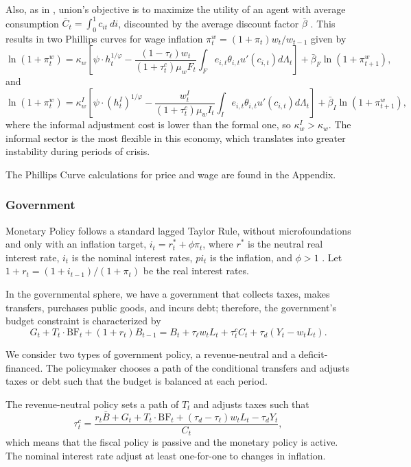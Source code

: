 \documentclass[12pt]{article}
\begin{document}
Also, as in \textcite{hagedorn2019fiscal}, union's objective is to maximize the utility
of an agent with average consumption $\bar C_t = \int_0^1 c_{it} \: di$, discounted by
the average discount factor $\bar \beta$ \parencite{auclert2021exchange}. This results
in two Phillips curves for wage inflation $\pi_t^w = (1+\pi_t) w_t / w_{t-1} $ given by
\[
\ln (1+\pi_t^w)
= \kappa_w \left[ \psi \cdot h_t^{1/\varphi}
- \frac{(1-\tau_\ell) w_t}{(1+\tau^c_t)\mu_w F_t}
    \int_F e_{i,t} \theta_{i,t} u'(c_{i,t}) d\Lambda_t \right]
+ \bar \beta_F \ln (1+\pi_{t+1}^w),
\]
and
\[
\ln (1+\pi_t^w)
= \kappa_w^I \left[ \psi \cdot \left( h_t^I \right)^{1/\varphi}
- \frac{w_t^I}{(1+\tau^c_t) \mu_w I_t}
    \int_I e_{i,t} \theta_{i,t} u'(c_{i,t}) d\Lambda_t \right]
+ \bar \beta_I \ln (1+\pi_{t+1}^w),
\]
where the informal adjustment cost is lower than the formal one, so
$\kappa_w^I > \kappa_w$. The informal sector is the most flexible in this economy, which
translates into greater instability during periods of crisis.

The Phillips Curve calculations for price and wage are found in the Appendix.

\subsubsection*{Government}
Monetary Policy follows a standard lagged Taylor Rule, without microfoundations and only
with an inflation target, $i_t = r^*_t + \phi \pi_t$, where $r^*$ is the neutral real
interest rate, $i_t$ is the nominal interest rates, $pi_t$ is the inflation, and
$\phi > 1$ \parencite{taylor1993discretion}. Let $1+r_t = (1+i_{t-1})/(1+\pi_t)$ be the
real interest rates.

In the governmental sphere, we have a government that collects taxes, makes transfers,
purchases public goods, and incurs debt; therefore, the government's budget constraint
is characterized by
\[
G_t + T_t \cdot \text{BF}_t + (1+r_t) B_{t-1}
= B_t + \tau_\ell w_t L_t + \tau^c_t C_t + \tau_d (Y_t - w_t L_t).
\]

We consider two types of government policy, a revenue-neutral and a deficit-financed.
The policymaker chooses a path of the conditional transfers and adjusts taxes or debt
such that the budget is balanced at each period.

The revenue-neutral policy sets a path of $T_t$ and adjusts taxes such that
\[
\tau^c_t = \frac{r_t \bar B + G_t + T_t \cdot \text{BF}_t
    + (\tau_d - \tau_\ell) w_t L_t - \tau_d Y_t}{C_t},
\]
which means that the fiscal policy is passive and the monetary policy is active. The
nominal interest rate adjust at least one-for-one to changes in inflation.
\end{document}
